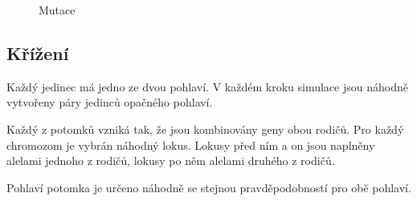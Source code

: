 \begin{figure}
  \centering


  \caption{Mutace}
\end{figure}

\subsection{Křížení}

Každý jedinec má jedno ze dvou pohlaví. V každém kroku simulace jsou náhodně vytvořeny páry jedinců opačného pohlaví.

Každý z potomků vzniká tak, že jsou kombinovány geny obou rodičů. Pro každý chromozom je vybrán náhodný lokus.
Lokusy před ním a on jsou naplněny alelami jednoho z rodičů, lokusy po něm alelami druhého z rodičů.

Pohlaví potomka je určeno náhodně se stejnou pravděpodobností pro obě pohlaví.

